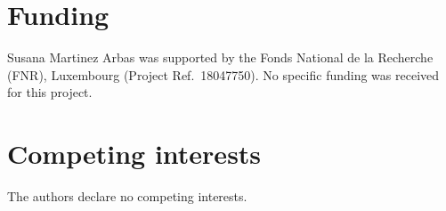 \documentclass[pdflatex,sn-mathphys-num]{sn-jnl}
\begin{document}

\maketitle










\section*{Funding}
Susana Martinez Arbas was supported by the Fonds National de la Recherche (FNR), Luxembourg
(Project Ref.\ 18047750).
No specific funding was received for this project.


\section*{Competing interests}
The authors declare no competing interests.


\end{document}
